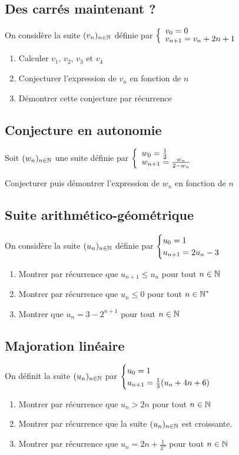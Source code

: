 \documentclass[oneside,12pt]{book}          %
\begin{document}
\subsection{Des carrés maintenant ?}

On considère la suite $(v_n)_{{n\in\mathbb N}}$ définie par $\accolsized{v_0=0\\v_{n+1}=v_n+2n+1}{0.8}$
\begin{enumerate}
    \item Calculer $v_1$, $v_2$, $v_3$ et $v_4$
    \item Conjecturer l'expression de $v_n$ en fonction de $n$
    \item Démontrer cette conjecture par récurrence
\end{enumerate}



\subsection{Conjecture en autonomie}
Soit $(w_n)_{{n\in\mathbb N}}$ une suite définie par $\accolsized{w_0=\frac{1}{2}\\w_{n+1}=\frac{w_n}{2-w_n}}{0.8}$

Conjecturer puis démontrer l'expression de $w_n$ en fonction de $n$



\subsection{Suite arithmético-géométrique}
On considère la suite ${(u_{n})_{n\in\mathbb N}}$ définie par $\defsuite{u_0=1}{2u_n-3}$
\begin{enumerate}
    \item Montrer par récurrence que $u_{n+1}\leq u_n$ pour tout ${n\in\mathbb N}$
    \item Montrer par récurrence que $u_n\leq0$ pour tout ${n\in\mathbb N}^*$
    \item Montrer que $u_n=3-2^{n+1}$ pour tout ${n\in\mathbb N}$
\end{enumerate}



\subsection{Majoration linéaire}
On définit la suite ${(u_{n})_{n\in\mathbb N}}$ par $\defsuite{u_0=1}{\frac{1}{3}(u_n+4n+6)}$
\begin{enumerate}
    \item Montrer par récurrence que $u_n>2n$ pour tout ${n\in\mathbb N}$
    \item Montrer par récurrence que la suite ${(u_{n})_{n\in\mathbb N}}$ est croissante.
    \item Montrer par récurrence que $u_n=2n+\frac{1}{3^n}$ pour tout ${n\in\mathbb N}$
\end{enumerate}
\end{document}
